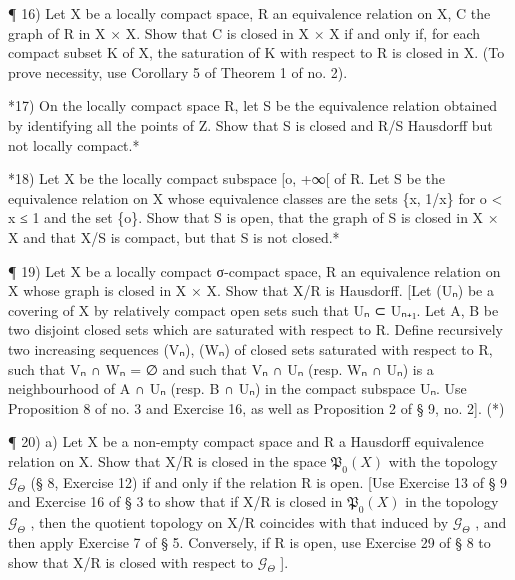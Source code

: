 ¶ 16) Let X be a locally compact space, R an equivalence relation on X, C the graph of R in X × X. Show that C is closed in X × X if and only if, for each compact subset K of X, the saturation of K with respect to R is closed in X. (To prove necessity, use Corollary 5 of Theorem 1 of no. 2).

*17) On the locally compact space R, let S be the equivalence relation obtained by identifying all the points of Z. Show that S is closed and R/S Hausdorff but not locally compact.*

*18) Let X be the locally compact subspace {[}o, +∞{[} of R. Let S be the equivalence relation on X whose equivalence classes are the sets \{x, 1/x\} for o \textless{} x ≤ 1 and the set \{o\}. Show that S is open, that the graph of S is closed in X × X and that X/S is compact, but that S is not closed.*

¶ 19) Let X be a locally compact σ-compact space, R an equivalence relation on X whose graph is closed in X × X. Show that X/R is Hausdorff. {[}Let (Uₙ) be a covering of X by relatively compact open sets such that Uₙ ⊂ Uₙ₊₁. Let A, B be two disjoint closed sets which are saturated with respect to R. Define recursively two increasing sequences (Vₙ), (Wₙ) of closed sets saturated with respect to R, such that Vₙ ∩ Wₙ = ∅ and such that Vₙ ∩ Uₙ (resp. Wₙ ∩ Uₙ) is a neighbourhood of A ∩ Uₙ (resp. B ∩ Uₙ) in the compact subspace Uₙ. Use Proposition 8 of no. 3 and Exercise 16, as well as Proposition 2 of § 9, no. 2{]}. (*)

¶ 20) a) Let X be a non-empty compact space and R a Hausdorff equivalence relation on X. Show that X/R is closed in the space \(\mathfrak{P}_{0}(X)\) with the topology \(\mathcal{G}_{\Theta}\) (§ 8, Exercise 12) if and only if the relation R is open. {[}Use Exercise 13 of § 9 and Exercise 16 of § 3 to show that if X/R is closed in \(\mathfrak{P}_{0}(X)\) in the topology \(\mathcal{G}_{\Theta}\) , then the quotient topology on X/R coincides with that induced by \(\mathcal{G}_{\Theta}\) , and then apply Exercise 7 of § 5. Conversely, if R is open, use Exercise 29 of § 8 to show that X/R is closed with respect to \(\mathcal{G}_{\Theta}\) {]}.

